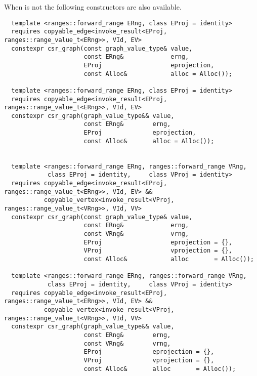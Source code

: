 When  is not  the following constructors are also available.

\begin{lstlisting}
  template <ranges::forward_range ERng, class EProj = identity>
  requires copyable_edge<invoke_result<EProj, ranges::range_value_t<ERng>>, VId, EV>
  constexpr csr_graph(const graph_value_type& value, 
                      const ERng&             erng, 
                      EProj                   eprojection, 
                      const Alloc&            alloc = Alloc());
  
  template <ranges::forward_range ERng, class EProj = identity>
  requires copyable_edge<invoke_result<EProj, ranges::range_value_t<ERng>>, VId, EV>
  constexpr csr_graph(graph_value_type&& value,
                      const ERng&        erng, 
                      EProj              eprojection, 
                      const Alloc&       alloc = Alloc());


  template <ranges::forward_range ERng, ranges::forward_range VRng,
            class EProj = identity,     class VProj = identity>
  requires copyable_edge<invoke_result<EProj, ranges::range_value_t<ERng>>, VId, EV> &&
           copyable_vertex<invoke_result<VProj, ranges::range_value_t<VRng>>, VId, VV>
  constexpr csr_graph(const graph_value_type& value,
                      const ERng&             erng,
                      const VRng&             vrng,
                      EProj                   eprojection = {},
                      VProj                   vprojection = {},
                      const Alloc&            alloc       = Alloc());

  template <ranges::forward_range ERng, ranges::forward_range VRng,
            class EProj = identity,     class VProj = identity>
  requires copyable_edge<invoke_result<EProj, ranges::range_value_t<ERng>>, VId, EV> &&
           copyable_vertex<invoke_result<VProj, ranges::range_value_t<VRng>>, VId, VV>
  constexpr csr_graph(graph_value_type&& value,
                      const ERng&        erng,
                      const VRng&        vrng,
                      EProj              eprojection = {},
                      VProj              vprojection = {},
                      const Alloc&       alloc       = Alloc());


\end{lstlisting}
